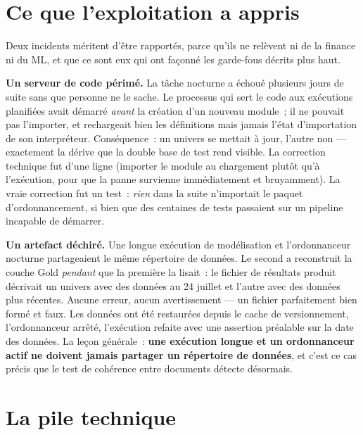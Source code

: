 \section{Ce que l'exploitation a appris}

Deux incidents méritent d'être rapportés, parce qu'ils ne relèvent ni de la
finance ni du ML, et que ce sont eux qui ont façonné les garde-fous décrits
plus haut.

\textbf{Un serveur de code périmé.} La tâche nocturne a échoué plusieurs jours de
suite sans que personne ne le sache. Le processus qui sert le code aux exécutions
planifiées avait démarré \emph{avant} la création d'un nouveau module~; il ne
pouvait pas l'importer, et rechargeait bien les définitions mais jamais l'état
d'importation de son interpréteur. Conséquence~: un univers se mettait à jour,
l'autre non — exactement la dérive que la double base de test rend visible. La
correction technique fut d'une ligne (importer le module au chargement plutôt
qu'à l'exécution, pour que la panne survienne immédiatement et bruyamment). La
vraie correction fut un test~: \emph{rien} dans la suite n'importait le paquet
d'ordonnancement, si bien que des centaines de tests passaient sur un pipeline
incapable de démarrer.

\textbf{Un artefact déchiré.} Une longue exécution de modélisation et
l'ordonnanceur nocturne partageaient le même répertoire de données. Le second a
reconstruit la couche Gold \emph{pendant} que la première la lisait~: le fichier
de résultats produit décrivait un univers avec des données au 24 juillet et
l'autre avec des données plus récentes. Aucune erreur, aucun avertissement — un
fichier parfaitement bien formé et faux. Les données ont été restaurées depuis le
cache de versionnement, l'ordonnanceur arrêté, l'exécution refaite avec une
assertion préalable sur la date des données. La leçon générale~: \textbf{une
exécution longue et un ordonnanceur actif ne doivent jamais partager un
répertoire de données}, et c'est ce cas précis que le test de cohérence entre
documents détecte désormais.

\section{La pile technique}

